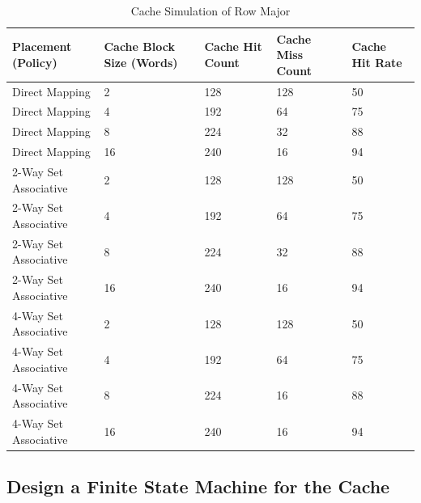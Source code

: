 \begin{table}
\caption{Cache Simulation of Row Major}
\label{tab:tableRowMajor}
\begin{tabular}{lllll}
\hline %
Placement (Policy) & Cache Block Size (Words) & Cache Hit Count & Cache Miss Count & Cache Hit Rate \\
\hline %
Direct Mapping & 2 & 128 & 128 & 50  \\
Direct Mapping & 4 & 192 & 64 & 75  \\
Direct Mapping & 8 & 224 & 32 & 88  \\
Direct Mapping & 16 & 240 & 16 & 94  \\
2-Way Set Associative & 2 & 128 & 128 & 50 \\
2-Way Set Associative & 4 & 192 & 64 & 75 \\
2-Way Set Associative & 8 & 224 & 32 & 88 \\
2-Way Set Associative & 16 & 240 & 16 & 94 \\
4-Way Set Associative & 2 & 128 & 128 & 50 \\
4-Way Set Associative & 4 & 192 & 64 & 75 \\
4-Way Set Associative & 8 & 224 & 16 & 88 \\
4-Way Set Associative & 16 & 240 & 16 & 94 \\
\hline %
\end{tabular} 
\end{table}


\newpage
\subsection{Design a Finite State Machine for the Cache}


\newpage
